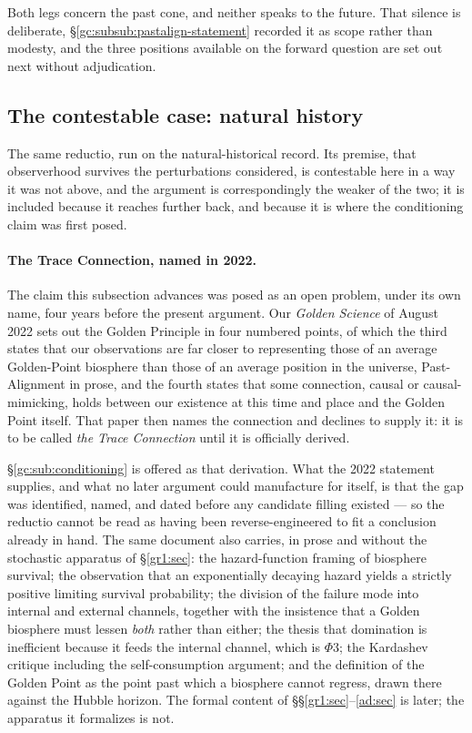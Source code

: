 \documentclass[11pt]{article}
\numberwithin{equation}{section}
\theoremstyle{plain}
\theoremstyle{definition}
\theoremstyle{remark}
\begin{document}
Both legs concern the past cone, and neither speaks to the future. That
silence is deliberate, \S\ref{gc:subsub:pastalign-statement} recorded
it as scope rather than modesty, and the three positions available on
the forward question are set out next without adjudication.

\subsection{The contestable case: natural history}\label{gc:sub:naturalhistory}

The same reductio, run on the natural-historical record. Its premise, that observerhood survives the perturbations considered, is
contestable here in a way it was not above, and the argument is
correspondingly the weaker of the two; it is included because it reaches
further back, and because it is where the conditioning claim was first
posed.

\paragraph{The Trace Connection, named in 2022.}\label{gc:rem:trace}
The claim this subsection advances was posed as an open problem, under
its own name, four years before the present argument. Our
\emph{Golden Science} of August 2022 \cite{GoldenScience22} sets out the
Golden Principle in four numbered points, of which the third states that
our observations are far closer to representing those of an average
Golden-Point biosphere than those of an average position in the universe, Past-Alignment in prose, and the fourth states that some
connection, causal or causal-mimicking, holds between our existence at
this time and place and the Golden Point itself. That paper then names
the connection and declines to supply it: it is to be called \emph{the
Trace Connection} until it is officially derived.

\S\ref{gc:sub:conditioning} is offered as that derivation. What the 2022
statement supplies, and what no later argument could manufacture for
itself, is that the gap was identified, named, and dated before any
candidate filling existed --- so the reductio cannot be read as having
been reverse-engineered to fit a conclusion already in hand. The same
document also carries, in prose and without the stochastic apparatus of
\S\ref{gr1:sec}: the hazard-function framing of biosphere survival; the
observation that an exponentially decaying hazard yields a strictly
positive limiting survival probability; the division of the failure mode
into internal and external channels, together with the insistence that a
Golden biosphere must lessen \emph{both} rather than either; the thesis
that domination is inefficient because it feeds the internal channel,
which is $\Phi3$; the Kardashev critique including the
self-consumption argument; and the definition of the Golden Point as the
point past which a biosphere cannot regress, drawn there against the
Hubble horizon. The formal content of
\S\S\ref{gr1:sec}--\ref{ad:sec} is later; the apparatus it formalizes is
not.
\end{document}
